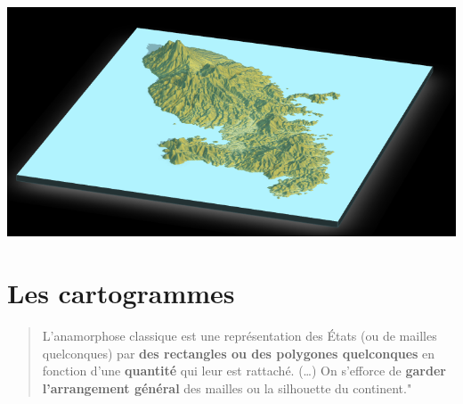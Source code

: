 \documentclass[]{book}
\newenvironment{Shaded}{\begin{snugshade}}{\end{snugshade}}
\newcommand{\KeywordTok}[1]{\textcolor[rgb]{0.13,0.29,0.53}{\textbf{#1}}}
\newcommand{\DataTypeTok}[1]{\textcolor[rgb]{0.13,0.29,0.53}{#1}}
\newcommand{\DecValTok}[1]{\textcolor[rgb]{0.00,0.00,0.81}{#1}}
\newcommand{\FloatTok}[1]{\textcolor[rgb]{0.00,0.00,0.81}{#1}}
\newcommand{\StringTok}[1]{\textcolor[rgb]{0.31,0.60,0.02}{#1}}
\newcommand{\OperatorTok}[1]{\textcolor[rgb]{0.81,0.36,0.00}{\textbf{#1}}}
\newcommand{\NormalTok}[1]{#1}
\begin{document}
\begin{Shaded}
\end{Shaded}

\begin{center}\includegraphics[width=7.66in]{img/rayshade} \end{center}

\section{Les cartogrammes}\label{les-cartogrammes}

\begin{quote}
L'anamorphose classique est une représentation des États (ou de mailles
quelconques) par \textbf{des rectangles ou des polygones quelconques} en
fonction d'une \textbf{quantité} qui leur est rattaché. (\ldots{}) On
s'efforce de \textbf{garder l'arrangement général} des mailles ou la
silhouette du continent."\\
\citet{Brunet93}
\end{quote}
\end{document}
